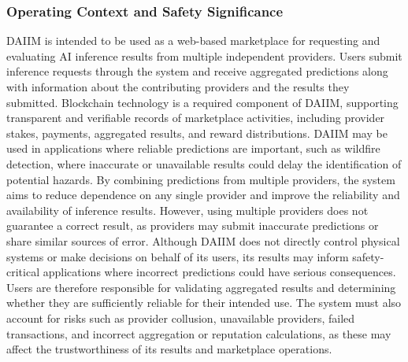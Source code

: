 \documentclass[12pt]{article}
\begin{document}
\subsubsection{Operating Context and Safety Significance}
DAIIM is intended to be used as a web-based marketplace for requesting and evaluating AI inference results from multiple independent providers. Users submit inference requests through the system and receive aggregated predictions along with information about the contributing providers and the results they submitted. Blockchain technology is a required component of DAIIM, supporting transparent and verifiable records of marketplace activities, including provider stakes, payments, aggregated results, and reward distributions.
DAIIM may be used in applications where reliable predictions are important, such as wildfire detection, where inaccurate or unavailable results could delay the identification of potential hazards. By combining predictions from multiple providers, the system aims to reduce dependence on any single provider and improve the reliability and availability of inference results. However, using multiple providers does not guarantee a correct result, as providers may submit inaccurate predictions or share similar sources of error.
Although DAIIM does not directly control physical systems or make decisions on behalf of its users, its results may inform safety-critical applications where incorrect predictions could have serious consequences. Users are therefore responsible for validating aggregated results and determining whether they are sufficiently reliable for their intended use. The system must also account for risks such as provider collusion, unavailable providers, failed transactions, and incorrect aggregation or reputation calculations, as these may affect the trustworthiness of its results and marketplace operations.
\end{document}
